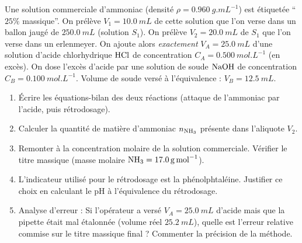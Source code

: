 \documentclass[11pt]{article}
\begin{document}
\begin{exercice}
Une solution commerciale d'ammoniac (densité $\rho = \SI{0,960}{g.mL^{-1}}$) est étiquetée ``$25\%$ massique''. On prélève $V_1 = \SI{10,0}{mL}$ de cette solution que l'on verse dans un ballon jaugé de $\SI{250,0}{mL}$ (solution $S_1$). On prélève $V_2 = \SI{20,0}{mL}$ de $S_1$ que l'on verse dans un erlenmeyer. On ajoute alors \textit{exactement} $V_A = \SI{25,0}{mL}$ d'une solution d'acide chlorhydrique $\ce{HCl}$ de concentration $C_A = \SI{0,500}{mol.L^{-1}}$ (en excès). On dose l'excès d'acide par une solution de soude $\ce{NaOH}$ de concentration $C_B = \SI{0,100}{mol.L^{-1}}$. Volume de soude versé à l'équivalence : $V_B = \SI{12,5}{mL}$.
\begin{enumerate}
    \item Écrire les équations-bilan des deux réactions (attaque de l'ammoniac par l'acide, puis rétrodosage).
    \item Calculer la quantité de matière d'ammoniac $n_{\ce{NH3}}$ présente dans l'aliquote $V_2$.
    \item Remonter à la concentration molaire de la solution commerciale. Vérifier le titre massique (masse molaire $\ce{NH3} = \SI{17,0}{g.mol^{-1}}$).
    \item L'indicateur utilisé pour le rétrodosage est la phénolphtaléine. Justifier ce choix en calculant le pH à l'équivalence du rétrodosage.
    \item Analyse d'erreur : Si l'opérateur a versé $V_A = \SI{25,0}{mL}$ d'acide mais que la pipette était mal étalonnée (volume réel $\SI{25,2}{mL}$), quelle est l'erreur relative commise sur le titre massique final ? Commenter la précision de la méthode.
\end{enumerate}
\end{exercice}
\end{document}
